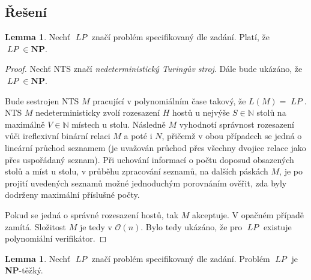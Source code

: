 \documentclass[a4paper, 12pt]{article}
\newcommand\lp{\mathop{\mbox{$\mathit{LP}$}}}
\theoremstyle{definition}
\theoremstyle{definition}
\theoremstyle{definition}
\newtheorem{lemma}[theorem]{Lemma}
\theoremstyle{remark}
\theoremstyle{remark}
\theoremstyle{remark}
\theoremstyle{remark}
\begin{document}
\subsection{Řešení}

\begin{lemma}
    \label{np}
    Nechť $\lp$ značí problém specifikovaný dle zadání. Platí, že $\lp \in \textbf{NP}$.
\end{lemma}

\begin{proof}
    Nechť NTS značí \textit{nedeterministický Turingův stroj}. Dále bude ukázáno, že $\lp \in \textbf{NP}$. 
    
    Bude sestrojen NTS $M$ pracující v polynomiálním čase takový, že $L(M) = \lp$. NTS $M$ nedeterministicky zvolí rozesazení $H$ hostů u nejvýše $S \in \mathbb{N}$ stolů na maximálně $V \in \mathbb{N}$ místech u stolu. Následně $M$ vyhodnotí správnost rozesazení vůči ireflexivní binární relaci $M$ a poté i $N$, přičemž v obou případech se jedná o lineární průchod seznamem (je uvažován průchod přes všechny dvojice relace jako přes uspořádaný seznam). Při uchování informací o počtu doposud obsazených stolů a míst u stolu, v průběhu zpracování seznamů, na dalších páskách $M$, je po projití uvedených seznamů možné jednoduchým porovnáním ověřit, zda byly dodrženy maximální příslušné počty.
    
    Pokud se jedná o správné rozesazení hostů, tak $M$ akceptuje. V opačném případě zamítá. Složitost $M$ je tedy v $\mathcal{O}(n)$. Bylo tedy ukázáno, že pro $\lp$ existuje polynomiální verifikátor.
\end{proof}

\begin{lemma}
    \label{np-hard}
    Nechť $\lp$ značí problém specifikovaný dle zadání. Problém $\lp$ je \textbf{NP}-těžký.
\end{lemma}
\end{document}
